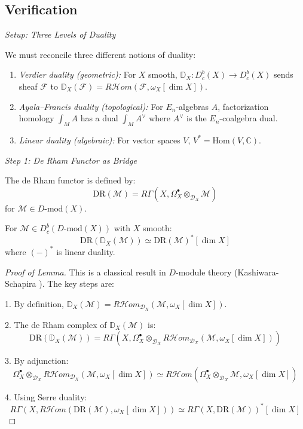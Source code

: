 \subsection{Verification}

\emph{Setup: Three Levels of Duality}

We must reconcile three different notions of duality:

\begin{enumerate}
\item \emph{Verdier duality (geometric):} For $X$ smooth, $\mathbb{D}_X: D^b_c(X) 
\to D^b_c(X)$ sends sheaf $\mathcal{F}$ to $\mathbb{D}_X(\mathcal{F}) = 
R\mathcal{H}om(\mathcal{F}, \omega_X[\dim X])$.

\item \emph{Ayala--Francis duality (topological):} For $E_n$-algebras $A$, 
factorization homology $\int_M A$ has a dual $\int_M A^{\vee}$ where $A^{\vee}$ 
is the $E_n$-coalgebra dual.

\item \emph{Linear duality (algebraic):} For vector spaces $V$, $V^* = 
\text{Hom}(V, \mathbb{C})$.
\end{enumerate}

\emph{Step 1: De Rham Functor as Bridge}

The de Rham functor is defined by:
\[\text{DR}(\mathcal{M}) = R\Gamma(X, \Omega^{\bullet}_X \otimes_{\mathcal{D}_X} \mathcal{M})\]
for $\mathcal{M} \in D\text{-mod}(X)$.

\begin{lemma}\label{lem:DR-verdier-compat}
For $\mathcal{M} \in D^b_c(D\text{-mod}(X))$ with $X$ smooth:
\[\text{DR}(\mathbb{D}_X(\mathcal{M})) \simeq \text{DR}(\mathcal{M})^* [\dim X]\]
where $(-)^*$ is linear duality.
\end{lemma}

\begin{proof}[Proof of Lemma]
This is a classical result in $D$-module theory (Kashiwara-Schapira \cite{KS90}). 
The key steps are:

1. By definition, $\mathbb{D}_X(\mathcal{M}) = R\mathcal{H}om_{\mathcal{D}_X}(\mathcal{M}, 
\omega_X[\dim X])$.

2. The de Rham complex of $\mathbb{D}_X(\mathcal{M})$ is:
\[\text{DR}(\mathbb{D}_X(\mathcal{M})) = R\Gamma(X, \Omega^{\bullet}_X 
\otimes_{\mathcal{D}_X} R\mathcal{H}om_{\mathcal{D}_X}(\mathcal{M}, \omega_X[\dim X]))\]

3. By adjunction:
\[\Omega^{\bullet}_X \otimes_{\mathcal{D}_X} R\mathcal{H}om_{\mathcal{D}_X}(\mathcal{M}, 
\omega_X[\dim X]) \simeq R\mathcal{H}om(\Omega^{\bullet}_X \otimes_{\mathcal{D}_X} 
\mathcal{M}, \omega_X[\dim X])\]

4. Using Serre duality:
\[R\Gamma(X, R\mathcal{H}om(\text{DR}(\mathcal{M}), \omega_X[\dim X])) 
\simeq R\Gamma(X, \text{DR}(\mathcal{M}))^* [\dim X]\]
\end{proof}


